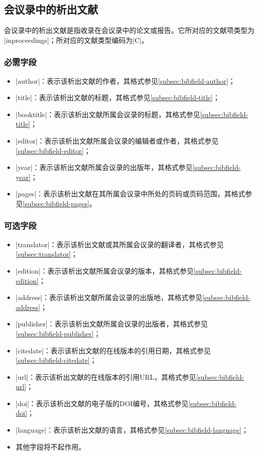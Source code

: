 \subsection{会议录中的析出文献}\label{subsec:bibtype-inproceedings}

会议录中的析出文献是指收录在会议录中的论文或报告。它所对应的{\BibTeX}文献项类型为
|inproceedings|；所对应的文献类型编码为|C|\cite{gbt3469-1983}。

\subsubsection{必需字段}

\begin{itemize}
\item |author|：表示该析出文献的作者，其格式参见\ref{subsec:bibfield-author}；
\item |title|：表示该析出文献的标题，其格式参见\ref{subsec:bibfield-title}；
\item |booktitle|：表示该析出文献所属会议录的标题，其格式参见\ref{subsec:bibfield-title}；
\item |editor|：表示该析出文献所属会议录的编辑者或作者，其格式参见\ref{subsec:bibfield-editor}；
\item |year|：表示该析出文献所属会议录的出版年，其格式参见\ref{subsec:bibfield-year}；
\item |pages|：表示该析出文献在其所属会议录中所处的页码或页码范围，其格式参见\ref{subsec:bibfield-pages}。
\end{itemize}

\subsubsection{可选字段}

\begin{itemize}
\item |translator|：表示该析出文献或其所属会议录的翻译者，其格式参见\ref{subsec:translator}；
\item |edition|：表示该析出文献所属会议录的版本，其格式参见\ref{subsec:bibfield-edition}；
\item |address|：表示该析出文献所属会议录的出版地，其格式参见\ref{subsec:bibfield-address}；
\item |publisher|：表示该析出文献所属会议录的出版者，其格式参见\ref{subsec:bibfield-publisher}；
\item |citedate|：表示该析出文献的在线版本的引用日期，其格式参见\ref{subsec:bibfield-citedate}；
\item |url|：表示该析出文献的在线版本的引用URL，其格式参见\ref{subsec:bibfield-url}；
\item |doi|：表示该析出文献的电子版的DOI编号，其格式参见\ref{subsec:bibfield-doi}；
\item |language|：表示该析出文献的语言，其格式参见\ref{subsec:bibfield-language}；
\item 其他字段将不起作用。
\end{itemize}

